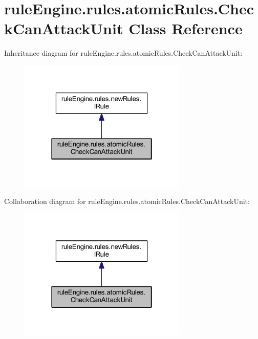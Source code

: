 \hypertarget{classrule_engine_1_1rules_1_1atomic_rules_1_1_check_can_attack_unit}{}\section{rule\+Engine.\+rules.\+atomic\+Rules.\+Check\+Can\+Attack\+Unit Class Reference}
\label{classrule_engine_1_1rules_1_1atomic_rules_1_1_check_can_attack_unit}


Inheritance diagram for rule\+Engine.\+rules.\+atomic\+Rules.\+Check\+Can\+Attack\+Unit\+:
\nopagebreak
\begin{figure}[H]
\begin{center}
\leavevmode
\includegraphics[width=226pt]{classrule_engine_1_1rules_1_1atomic_rules_1_1_check_can_attack_unit__inherit__graph}
\end{center}
\end{figure}


Collaboration diagram for rule\+Engine.\+rules.\+atomic\+Rules.\+Check\+Can\+Attack\+Unit\+:
\nopagebreak
\begin{figure}[H]
\begin{center}
\leavevmode
\includegraphics[width=226pt]{classrule_engine_1_1rules_1_1atomic_rules_1_1_check_can_attack_unit__coll__graph}
\end{center}
\end{figure}
